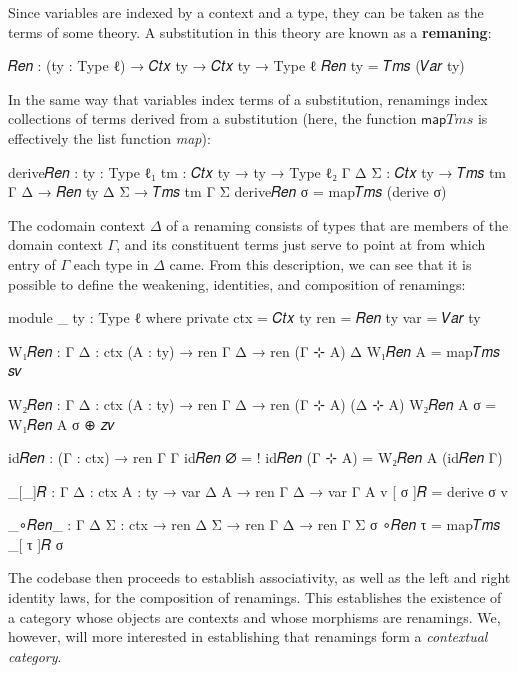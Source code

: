 Since variables are indexed by a context and a type, they can be taken as the
terms of some theory. A substitution in this theory are known as a
\textbf{remaning}:
\begin{code}
𝑅𝑒𝑛 : (ty : Type ℓ) → 𝐶𝑡𝑥 ty → 𝐶𝑡𝑥 ty → Type ℓ
𝑅𝑒𝑛 ty = 𝑇𝑚𝑠 (𝑉𝑎𝑟 ty)
\end{code}
In the same way that variables index terms of a substitution, renamings index
collections of terms derived from a substitution (here, the function
$\mathsf{map}\mathit{Tms}$ is effectively the list function \emph{map}):
\begin{code}
derive𝑅𝑒𝑛 : {ty : Type ℓ₁} {tm : 𝐶𝑡𝑥 ty → ty → Type ℓ₂} {Γ Δ Σ : 𝐶𝑡𝑥 ty} →
  𝑇𝑚𝑠 tm Γ Δ → 𝑅𝑒𝑛 ty Δ Σ → 𝑇𝑚𝑠 tm Γ Σ
derive𝑅𝑒𝑛 σ = map𝑇𝑚𝑠 (derive σ)
\end{code}
The codomain context $\Delta$ of a renaming consists of types that are members
of the domain context $\Gamma$, and its constituent terms just serve to point at
from which entry of $\Gamma$ each type in $\Delta$ came. From this description,
we can see that it is possible to define the weakening, identities, and
composition of renamings:

\begin{code}
module _ {ty : Type ℓ} where
  private
    ctx = 𝐶𝑡𝑥 ty
    ren = 𝑅𝑒𝑛 ty
    var = 𝑉𝑎𝑟 ty

  W₁𝑅𝑒𝑛 : {Γ Δ : ctx} (A : ty) → ren Γ Δ → ren (Γ ⊹ A) Δ
  W₁𝑅𝑒𝑛 A = map𝑇𝑚𝑠 𝑠𝑣

  W₂𝑅𝑒𝑛 : {Γ Δ : ctx} (A : ty) → ren Γ Δ → ren (Γ ⊹ A) (Δ ⊹ A)
  W₂𝑅𝑒𝑛 A σ = W₁𝑅𝑒𝑛 A σ ⊕ 𝑧𝑣

  id𝑅𝑒𝑛 : (Γ : ctx) → ren Γ Γ
  id𝑅𝑒𝑛 ∅ = !
  id𝑅𝑒𝑛 (Γ ⊹ A) = W₂𝑅𝑒𝑛 A (id𝑅𝑒𝑛 Γ)

  _[_]𝑅 : {Γ Δ : ctx} {A : ty} → var Δ A → ren Γ Δ → var Γ A
  v [ σ ]𝑅 = derive σ v

  _∘𝑅𝑒𝑛_ : {Γ Δ Σ : ctx} → ren Δ Σ → ren Γ Δ → ren Γ Σ
  σ ∘𝑅𝑒𝑛 τ = map𝑇𝑚𝑠 _[ τ ]𝑅 σ
\end{code}
\noindent
The codebase then proceeds to establish associativity, as well as the left and
right identity laws, for the composition of renamings. This establishes the
existence of a category whose objects are contexts and whose morphisms are
renamings. We, however, will more interested in establishing that renamings
form a \emph{contextual category}.

